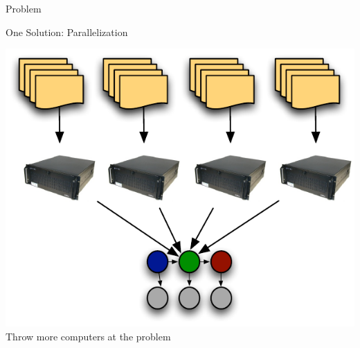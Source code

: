 \begin{frame}{Problem}
\begin{center}
{    }
  \end{center}
\end{frame}

\begin{frame}{One Solution: Parallelization}
  \begin{center}
    \includegraphics[width=.7\linewidth]{onlineag/parallel} \\
    Throw more computers at the problem%
  \end{center}
\end{frame}

